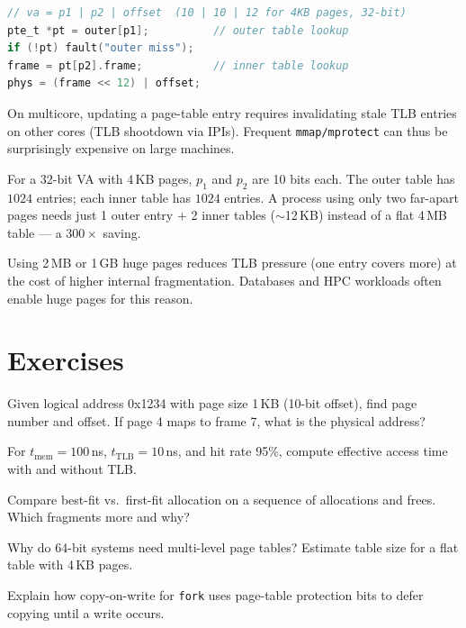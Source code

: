 \begin{lstlisting}[language=C,caption={Page-table walk (two-level, sketch)}]
// va = p1 | p2 | offset  (10 | 10 | 12 for 4KB pages, 32-bit)
pte_t *pt = outer[p1];          // outer table lookup
if (!pt) fault("outer miss");
frame = pt[p2].frame;           // inner table lookup
phys = (frame << 12) | offset;
\end{lstlisting}

\begin{remark}
On multicore, updating a page-table entry requires invalidating stale TLB
entries on other cores (TLB shootdown via IPIs). Frequent \texttt{mmap/mprotect}
can thus be surprisingly expensive on large machines.
\end{remark}

\begin{example}
For a 32-bit VA with 4\,KB pages, $p_1$ and $p_2$ are 10 bits each. The outer
table has $1024$ entries; each inner table has $1024$ entries. A process using
only two far-apart pages needs just 1 outer entry $+$ 2 inner tables ($\sim$12\,KB)
instead of a flat 4\,MB table --- a $300\times$ saving.
\end{example}

\begin{remark}
Using 2\,MB or 1\,GB huge pages reduces TLB pressure (one entry covers more)
at the cost of higher internal fragmentation. Databases and HPC workloads
often enable huge pages for this reason.
\end{remark}

\section{Exercises}
\label{sec:ch06-ex}
\begin{exercise}
Given logical address 0x1234 with page size 1\,KB (10-bit offset), find page
number and offset. If page 4 maps to frame 7, what is the physical address?
\end{exercise}
\begin{exercise}
For $t_{\text{mem}}=100$\,ns, $t_{\text{TLB}}=10$\,ns, and hit rate 95\%,
compute effective access time with and without TLB.
\end{exercise}
\begin{exercise}
Compare best-fit vs.\ first-fit allocation on a sequence of allocations and
frees. Which fragments more and why?
\end{exercise}
\begin{exercise}
Why do 64-bit systems need multi-level page tables? Estimate table size for a
flat table with 4\,KB pages.
\end{exercise}
\begin{exercise}
Explain how copy-on-write for \texttt{fork} uses page-table protection bits to
defer copying until a write occurs.
\end{exercise}
